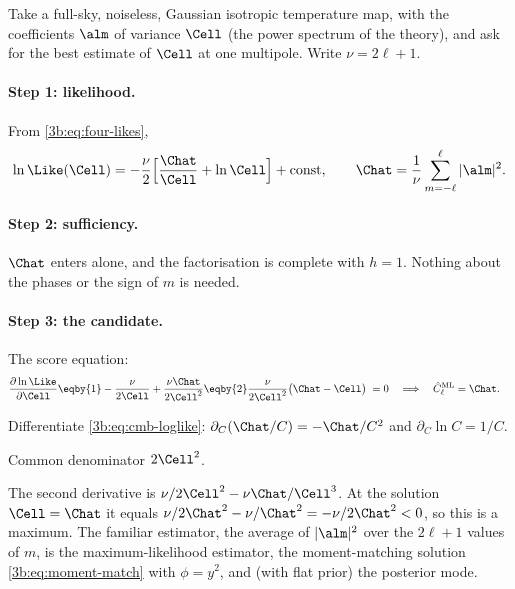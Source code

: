 Take a full-sky, noiseless, Gaussian isotropic temperature map, with the
coefficients $\alm$ of variance $\Cell$ (the power spectrum of the theory),
and ask for the best estimate of $\Cell$ at one multipole. Write
$\nu=2\ell+1$.

\paragraph{Step 1: likelihood.} From \eqref{3b:eq:four-likes},
\begin{equation}
  \ln\Like(\Cell)=-\frac{\nu}{2}\Bigl[\frac{\Chat}{\Cell}+\ln\Cell\Bigr]+\text{const},
  \qquad\Chat=\frac1\nu\sum_{m=-\ell}^{\ell}|\alm|^2 .
  \label{3b:eq:cmb-loglike}
\end{equation}

\paragraph{Step 2: sufficiency.} $\Chat$ enters alone, and the factorisation
is complete with $h=1$. Nothing about the phases or the sign of $m$ is needed.

\paragraph{Step 3: the candidate.} The score equation:
\begin{align}
  \frac{\partial\ln\Like}{\partial\Cell}
  &\eqby{1}-\frac{\nu}{2\Cell}+\frac{\nu\Chat}{2\Cell^2}
   \eqby{2}\frac{\nu}{2\Cell^2}\bigl(\Chat-\Cell\bigr)
   \;=0\quad\Longrightarrow\quad\hat C_\ell^{\rm ML}=\Chat .
  \label{3b:eq:cmb-score}
\end{align}
\begin{explain}
  \item Differentiate \eqref{3b:eq:cmb-loglike}: $\partial_C(\Chat/C)=-\Chat/C^2$ and $\partial_C\ln C=1/C$.
  \item Common denominator $2\Cell^2$.
\end{explain}
The second derivative is $\nu/2\Cell^2-\nu\Chat/\Cell^3$. At the solution
$\Cell=\Chat$ it equals $\nu/2\Chat^2-\nu/\Chat^2=-\nu/2\Chat^2<0$, so this
is a maximum. The
familiar estimator, the average of $|\alm|^2$ over the $2\ell+1$ values of
$m$, is the maximum-likelihood estimator, the moment-matching solution
\eqref{3b:eq:moment-match} with $\phi=y^2$, and (with flat prior) the
posterior mode.

